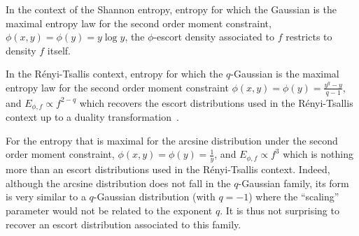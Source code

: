 \documentclass[entropy,article,submit,moreauthors,pdftex]{Definitions/mdpi}
\newcounter{GaussExample}%
\newcounter{qGaussExample}%
\newcounter{arcsineExample}%
\begin{document}
\renewcommand{\theexample}{\arabic{example}}
\begin{Example}
  In the context of  the Shannon entropy, entropy for which  the Gaussian is the
  maximal  entropy law  for the  second  order moment  constraint, $\phi(x,y)  =
  \phi(y) = y \log y$, the  $\phi$-escort density associated to $f$ restricts to
  density $f$ itself.
\end{Example}
%
\begin{Example}
  In  the R\'enyi-Tsallis  context, entropy  for which  the $q$-Gaussian  is the
  maximal  entropy law  for  the  second order  moment  constraint $\phi(x,y)  =
  \phi(y) = \frac{y^q-y}{q-1}$, and  $E_{\phi,f} \propto f^{2-q}$ which recovers
  the escort distributions  used in the R\'enyi-Tsallis context up  to a duality
  transformation~\cite{Nau11}.
\end{Example}
%
\begin{Example}
  For the entropy that is maximal  for the arcsine distribution under the second
  order moment constraint, $\phi(x,y) =  \phi(y) = \frac{1}{y}$, and $E_{\phi,f}
  \propto f^3$  which is nothing more  than an escort distributions  used in the
  R\'enyi-Tsallis context.   Indeed, although the arcsine  distribution does not
  fall in  the $q$-Gaussian family, its  form is very similar  to a $q$-Gaussian
  distribution (with  $q =  -1$) where  the ``scaling''  parameter would  not be
  related to the exponent  $q$.  It is thus not surprising  to recover an escort
  distribution associated to this family.
\end{Example}
\end{document}
